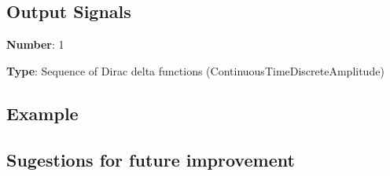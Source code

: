 \documentclass[a4paper]{article}
\begin{document}
\subsection*{Output Signals}

\textbf{Number}: 1

\textbf{Type}: Sequence of Dirac delta functions (ContinuousTimeDiscreteAmplitude)

\subsection*{Example}


\subsection*{Sugestions for future improvement}

\pagebreak
\end{document}
